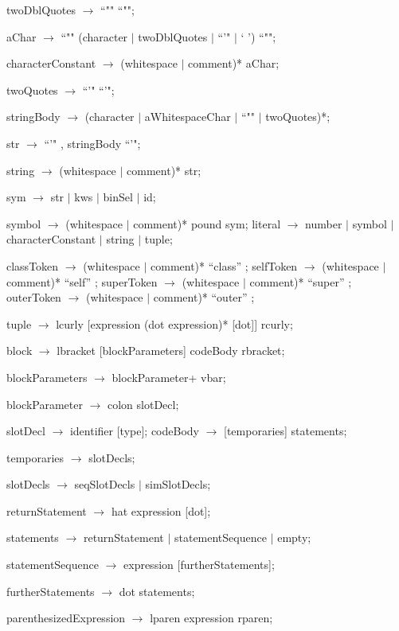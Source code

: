 \documentclass{article}
\begin{document}
\begin{newspeak}
twoDblQuotes $\rightarrow$   ``""  ``"";      

aChar $\rightarrow$  ``""  (character $|$ twoDblQuotes $|$  ``'" $|$ `  ')  ``"";

characterConstant $\rightarrow$ (whitespace $|$ comment)*  aChar;
 
twoQuotes $\rightarrow$   ``'"  ``'";    

stringBody $\rightarrow$ (character $|$ aWhitespaceChar $|$  ``"" $|$ twoQuotes)*;

str $\rightarrow$  ``'" ,  stringBody   ``'";

string $\rightarrow$ (whitespace $|$ comment)*  str;

sym $\rightarrow$ str $|$ kws $|$ binSel $|$ id;

symbol $\rightarrow$ (whitespace $|$ comment)* pound sym;
literal $\rightarrow$  number $|$ symbol $|$ characterConstant $|$ string $|$ tuple;


classToken $\rightarrow$ (whitespace $|$ comment)* ``class'' ;
selfToken $\rightarrow$ (whitespace $|$ comment)* ``self'' ;
superToken $\rightarrow$ (whitespace $|$ comment)* ``super'' ;
outerToken $\rightarrow$ (whitespace $|$ comment)* ``outer'' ;

tuple $\rightarrow$  lcurly [expression (dot expression)* [dot]]  rcurly;

block $\rightarrow$ lbracket  [blockParameters] codeBody  rbracket;
 
blockParameters $\rightarrow$  blockParameter+ vbar;
 
blockParameter $\rightarrow$ colon slotDecl;                                

slotDecl $\rightarrow$ identifier [type];    
codeBody $\rightarrow$ [temporaries]  statements;    
  
temporaries $\rightarrow$ slotDecls;
  
slotDecls $\rightarrow$ seqSlotDecls $|$ simSlotDecls;

returnStatement $\rightarrow$ hat  expression [dot];
  
statements $\rightarrow$ returnStatement  $|$   
                  statementSequence $|$
                  empty;
                         
statementSequence $\rightarrow$ expression [furtherStatements];
  
furtherStatements $\rightarrow$ dot statements;     

parenthesizedExpression $\rightarrow$ lparen expression rparen;


\end{newspeak}
\end{document}

